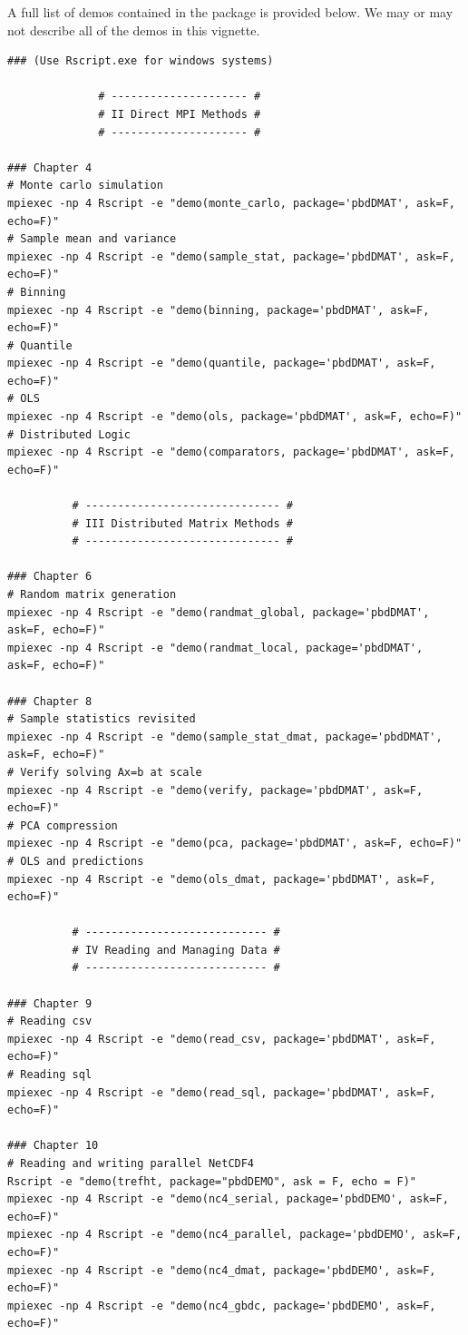 A full list of demos contained in the  package is provided below.
We may or may not describe all of the demos in this vignette.

\begin{lstlisting}[title=List of Demos]
### (Use Rscript.exe for windows systems)

		      # --------------------- #
		      # II Direct MPI Methods #
		      # --------------------- #

### Chapter 4
# Monte carlo simulation
mpiexec -np 4 Rscript -e "demo(monte_carlo, package='pbdDMAT', ask=F, echo=F)"
# Sample mean and variance
mpiexec -np 4 Rscript -e "demo(sample_stat, package='pbdDMAT', ask=F, echo=F)"
# Binning
mpiexec -np 4 Rscript -e "demo(binning, package='pbdDMAT', ask=F, echo=F)"
# Quantile
mpiexec -np 4 Rscript -e "demo(quantile, package='pbdDMAT', ask=F, echo=F)"
# OLS
mpiexec -np 4 Rscript -e "demo(ols, package='pbdDMAT', ask=F, echo=F)"
# Distributed Logic
mpiexec -np 4 Rscript -e "demo(comparators, package='pbdDMAT', ask=F, echo=F)"

		  # ------------------------------ #
		  # III Distributed Matrix Methods #
		  # ------------------------------ #

### Chapter 6
# Random matrix generation
mpiexec -np 4 Rscript -e "demo(randmat_global, package='pbdDMAT', ask=F, echo=F)"
mpiexec -np 4 Rscript -e "demo(randmat_local, package='pbdDMAT', ask=F, echo=F)"

### Chapter 8
# Sample statistics revisited
mpiexec -np 4 Rscript -e "demo(sample_stat_dmat, package='pbdDMAT', ask=F, echo=F)"
# Verify solving Ax=b at scale
mpiexec -np 4 Rscript -e "demo(verify, package='pbdDMAT', ask=F, echo=F)"
# PCA compression
mpiexec -np 4 Rscript -e "demo(pca, package='pbdDMAT', ask=F, echo=F)"
# OLS and predictions
mpiexec -np 4 Rscript -e "demo(ols_dmat, package='pbdDMAT', ask=F, echo=F)"

		  # ---------------------------- #
		  # IV Reading and Managing Data #
		  # ---------------------------- #

### Chapter 9
# Reading csv
mpiexec -np 4 Rscript -e "demo(read_csv, package='pbdDMAT', ask=F, echo=F)"
# Reading sql
mpiexec -np 4 Rscript -e "demo(read_sql, package='pbdDMAT', ask=F, echo=F)"

### Chapter 10
# Reading and writing parallel NetCDF4
Rscript -e "demo(trefht, package="pbdDEMO", ask = F, echo = F)"
mpiexec -np 4 Rscript -e "demo(nc4_serial, package='pbdDEMO', ask=F, echo=F)"
mpiexec -np 4 Rscript -e "demo(nc4_parallel, package='pbdDEMO', ask=F, echo=F)"
mpiexec -np 4 Rscript -e "demo(nc4_dmat, package='pbdDEMO', ask=F, echo=F)"
mpiexec -np 4 Rscript -e "demo(nc4_gbdc, package='pbdDEMO', ask=F, echo=F)"


\end{lstlisting}
